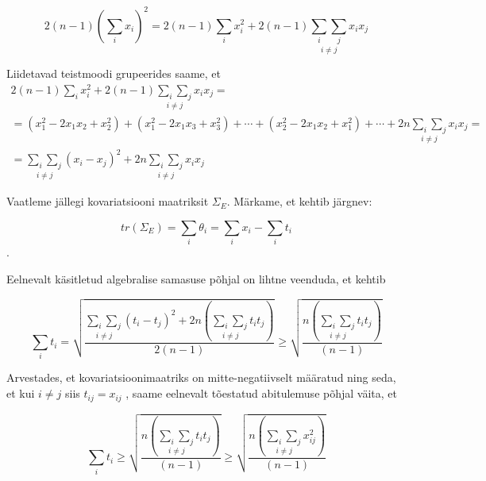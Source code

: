 \documentclass[a4paper,12pt]{article}
\numberwithin{equation}{section}
\theoremstyle{definition}
\begin{document}
\begin{equation*}
2 \left( n-1 \right) \left( \sum_i x_i \right)^2 =  2 \left( n-1 \right) \sum_i x_i^2 + 2 \left( n-1 \right) \underset{i \neq j}{\sum_i \sum_j} x_i x_j
\end{equation*}

Liidetavad teistmoodi grupeerides saame, et
\begin{equation*}
\begin{gathered}
2 \left( n-1 \right) \sum_i x_i^2 + 2 \left( n-1 \right) \underset{i \neq j}{\sum_i \sum_j} x_i x_j = \\
= \left( x_{1}^2 - 2 x_1 x_2 + x_{2}^2 \right) + \left( x_{1}^2 - 2 x_1 x_3 + x_{3}^2 \right) + \cdots + \left( x_{2}^2 - 2 x_1 x_2 + x_{1}^2 \right) + \cdots + 2n \underset{i \neq j}{\sum_i \sum_j} x_i x_j = \\
= \underset{i \neq j}{\sum_i \sum_j} (x_i -  x_j)^2 + 2n \underset{i \neq j}{\sum_i \sum_j} x_i x_j
\end{gathered}
\end{equation*}

Vaatleme jällegi kovariatsiooni maatriksit $\Sigma_E$. Märkame, et kehtib järgnev:

\begin{equation*}
tr \left( \Sigma_E \right) = \sum_i \theta_i = \sum_i x_i - \sum_i t_i 
\end{equation*}.

Eelnevalt käsitletud algebralise samasuse põhjal on lihtne veenduda, et kehtib

\begin{equation*}
\sum_i t_i = \sqrt{\frac{\underset{i \neq j}{\sum_i \sum_j} (t_i -  t_j)^2 + 2n \left( \underset{i \neq j}{\sum_i \sum_j} t_i t_j \right) }{2 \left( n -1 \right)}} \geq \sqrt{\frac{ n \left( \underset{i \neq j}{\sum_i \sum_j} t_i t_j \right) }{\left( n -1 \right)}}
\end{equation*}

Arvestades, et kovariatsioonimaatriks on mitte-negatiivselt määratud ning seda, et kui $i \neq j$ siis $t_{ij} = x_{ij}$ , saame eelnevalt tõestatud abitulemuse põhjal väita, et

\begin{equation*}
\sum_i t_i  \geq \sqrt{\frac{ n \left( \underset{i \neq j}{\sum_i \sum_j} t_i t_j \right) }{\left( n -1 \right)}} \geq \sqrt{\frac{ n \left( \underset{i \neq j}{\sum_i \sum_j} x_{ij}^2 \right) }{\left( n -1 \right)}}
\end{equation*} 
\end{document}
